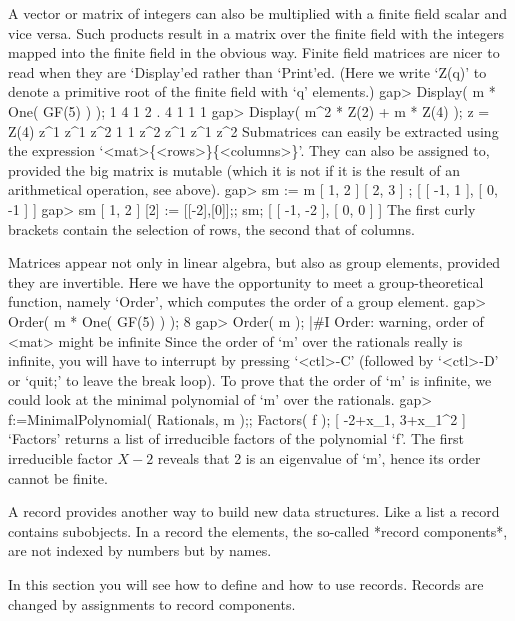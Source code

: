 A vector or matrix of integers can also be multiplied
with a finite field scalar and vice versa.
Such products result in a matrix over the finite field with the integers
mapped into the finite field in the obvious way.
Finite field matrices are nicer to read when they are `Display'ed rather
than `Print'ed.
(Here  we write `Z(q)' to denote a  primitive root of the finite field
with `q' elements.)
\beginexample
gap> Display( m * One( GF(5) ) );
 1 4 1
 2 . 4
 1 1 1
gap> Display( m^2 * Z(2) + m * Z(4) );
z = Z(4)
 z^1 z^1 z^2
   1   1 z^2
 z^1 z^1 z^2
\endexample
Submatrices    can  easily     be    extracted  using    the   expression
`<mat>\{<rows>\}\{<columns>\}'. They   can also be  assigned to, provided
the big matrix  is mutable (which  it is not if it  is  the result of  an
arithmetical operation, see above).
\beginexample
gap> sm := m{ [ 1, 2 ] }{ [ 2, 3 ] };
[ [ -1, 1 ], [ 0, -1 ] ]
gap> sm{ [ 1, 2 ] }{ [2] } := [[-2],[0]];;  sm;
[ [ -1, -2 ], [ 0, 0 ] ]
\endexample
The first curly brackets contain the selection of rows,
the second that of columns.

Matrices appear not only in linear algebra, but also as group elements,
provided they are invertible.
Here we have the opportunity to meet a group-theoretical function,
namely `Order', which computes the order of a group element.
\begintt
gap> Order( m * One( GF(5) ) );
8
gap> Order( m );
|#I  Order: warning, order of <mat> might be infinite
\endtt
Since the order  of `m' over the  rationals really is  infinite, you will
have to interrupt {\GAP} by  pressing `<ctl>-C' (followed by `<ctl>-D' or
`quit;'  to leave the   break loop). To prove  that  the order of `m'  is
infinite,  we  could look  at  the  minimal  polynomial  of `m'  over the
rationals.
\beginexample
gap> f:=MinimalPolynomial( Rationals, m );; Factors( f );
[ -2+x_1, 3+x_1^2 ]
\endexample
`Factors'  returns a list of  irreducible factors  of the polynomial `f'.
The first  irreducible factor $X-2$ reveals   that 2 is an  eigenvalue of
`m', hence its order cannot be finite.



A record provides another way to  build new data structures.  Like a list
a record contains subobjects.
In a record the elements, the so-called *record components*,
are not indexed by numbers but by names.

In this section you will see how to define and how to use records.
Records are changed by assignments to record components.

